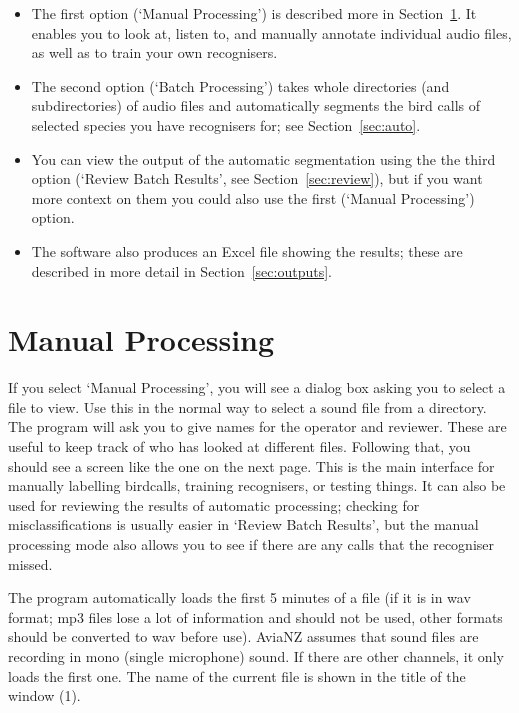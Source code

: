 \documentclass{article}
\begin{document}
\begin{itemize}
\item The first option (`Manual Processing') is described more in Section~\ref{sec:manual}. It enables you to look at, listen to, and manually annotate individual audio files, as well as to train your own recognisers. 
\item The second option (`Batch Processing') takes whole directories (and subdirectories) of audio files and automatically segments the bird calls of selected species you have recognisers for; see Section~\ref{sec:auto}. 
\item You can view the output of the automatic segmentation using the the third option (`Review Batch Results', see Section~\ref{sec:review}), but if you want more context on them you could also use the first (`Manual Processing') option. 
\item The software also produces an Excel file showing the results; these are described in more detail in Section~\ref{sec:outputs}. 
\end{itemize}

\section{Manual Processing}
\label{sec:manual}

If you select `Manual Processing', you will see a dialog box asking you to select a file to view. Use this in the normal way to select a sound file from a directory. The program will ask you to give names for the operator and reviewer. These are useful to keep track of who has looked at different files. Following that, you should see a screen like the one on the next page. This is the main interface for manually labelling birdcalls, training recognisers, or testing things. It can also be used for reviewing the results of automatic processing; checking for misclassifications is usually easier in `Review Batch Results', but the manual processing mode also allows you to see if there are any calls that the recogniser missed.

The program automatically loads the first 5 minutes of a file (if it is in wav format; mp3 files lose a lot of information and should not be used, other formats should be converted to wav before use). AviaNZ assumes that sound files are recording in mono (single microphone) sound. If there are other channels, it only loads the first one.
The name of the current file is shown in the title of the window (1).
\end{document}
